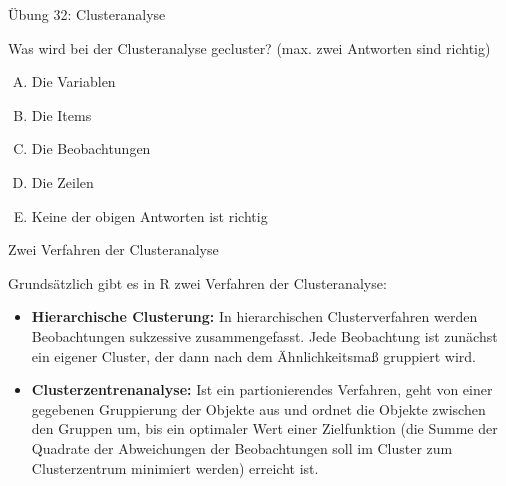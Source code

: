 \documentclass[12pt,ngerman,a4paper,ignorenonframetext,]{beamer}
\providecommand{\tightlist}{%
  \setlength{\itemsep}{0pt}\setlength{\parskip}{0pt}}
\begin{document}
\begin{frame}{Übung 32: Clusteranalyse}
\protect\hypertarget{ubung-32-clusteranalyse}{}

Was wird bei der Clusteranalyse gecluster? (max. zwei Antworten sind
richtig)

\begin{enumerate}
[A.]
\tightlist
\item
  Die Variablen
\item
  Die Items
\item
  Die Beobachtungen
\item
  Die Zeilen
\item
  Keine der obigen Antworten ist richtig
\end{enumerate}


\end{frame}

\begin{frame}{Zwei Verfahren der Clusteranalyse}
\protect\hypertarget{zwei-verfahren-der-clusteranalyse}{}

Grundsätzlich gibt es in R zwei Verfahren der Clusteranalyse:

\begin{itemize}
\item
  \textbf{Hierarchische Clusterung:} In hierarchischen Clusterverfahren
  werden Beobachtungen sukzessive zusammengefasst. Jede Beobachtung ist
  zunächst ein eigener Cluster, der dann nach dem Ähnlichkeitsmaß
  gruppiert wird.
\item
  \textbf{Clusterzentrenanalyse:} Ist ein partionierendes Verfahren,
  geht von einer gegebenen Gruppierung der Objekte aus und ordnet die
  Objekte zwischen den Gruppen um, bis ein optimaler Wert einer
  Zielfunktion (die Summe der Quadrate der Abweichungen der
  Beobachtungen soll im Cluster zum Clusterzentrum minimiert werden)
  erreicht ist.
\end{itemize}

\end{frame}
\end{document}
